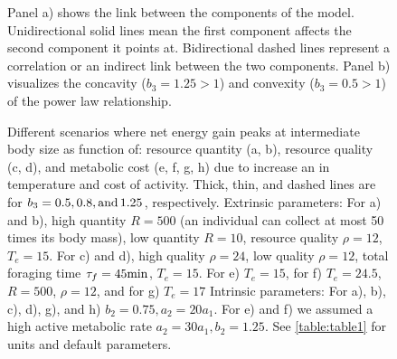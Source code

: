 \clearpage

\begin{figure}[H]
\begin{center}
\caption{
    \setstretch{\stretchby}
	Panel a) shows the link between the components of the model.
	Unidirectional solid lines mean the first component affects the second component it points at.
	Bidirectional dashed lines represent a correlation or an indirect link between the two components.
	Panel b) visualizes the concavity ($b_3  = 1.25 > 1$) and convexity ($b_3 = 0.5 > 1$) of the power law relationship.
}
\label{fig1}
\end{center}
\end{figure}
%
\begin{figure}[H]
\begin{center}
\caption{
    \setstretch{\stretchby}
	Different scenarios where net energy gain peaks at intermediate body size as function of: resource quantity (a, b), resource quality (c, d), and metabolic cost (e, f, g, h) due to increase an in temperature and cost of activity.
	Thick, thin, and dashed lines are for $b_3 = 0.5, 0.8, \rm{ and }\, 1.25$, respectively.
	Extrinsic parameters:
	For a) and b), high quantity $R = 500$ (an individual can collect at most 50 times its body mass), low quantity $R= 10$, resource quality $\rho = 12$, $T_e = 15$.
	For c) and d), high quality $\rho = 24$, low quality $\rho = 12$, total foraging time $\tau_f = 45 \rm{min}$, $T_e = 15$.
	For e) $T_e = 15$, for f) $T_e = 24.5$, $R = 500$, $\rho = 12$, and for g) $T_e = 17$
	Intrinsic parameters:
	For a), b), c), d), g), and h) $b_2 = 0.75, a_2 = 20 a_1$.
	For e) and f) we assumed a high active metabolic rate $a_2 = 30 a_1, b_2  = 1.25$.
	See \cref{table:table1} for units and default parameters.
}
\label{fig2}
\end{center}
\end{figure}


